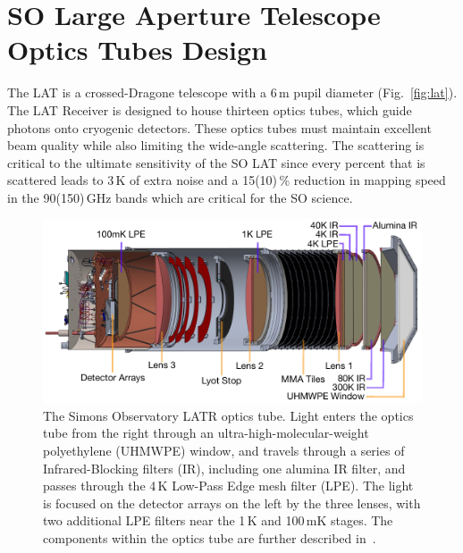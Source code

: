 \section{SO Large Aperture Telescope Optics Tubes Design}
\label{sec:optics_tube}

The LAT is a crossed-Dragone telescope with a 6\,m pupil diameter (Fig.~\ref{fig:lat}).  The LAT Receiver is designed to house thirteen optics tubes, which guide photons onto cryogenic detectors.  These optics tubes must maintain excellent beam quality while also limiting the wide-angle scattering.  The scattering is critical to the ultimate sensitivity of the SO LAT since every percent that is scattered leads to 3\,K of extra noise and a 15(10)\,\% reduction in mapping speed in the 90(150)\,GHz bands which are critical for the SO science.

\begin{figure}
    \centering
    \includegraphics[width = \textwidth]{Figures/LATR_OT_Tester_20190221_3.pdf}
    \caption{The Simons Observatory LATR optics tube.  Light enters the optics tube from the right through an ultra-high-molecular-weight polyethylene (UHMWPE) window, and travels through a series of Infrared-Blocking filters (IR), including one alumina IR filter, and passes through the 4\,K Low-Pass Edge mesh filter (LPE). The light is focused on the detector arrays on the left by the three lenses, with two additional LPE filters near the 1\,K and 100\,mK stages.  The components within the optics tube are further described in~\cite{xu/etal:2020c}.}
    \label{fig:latrt}
\end{figure}


